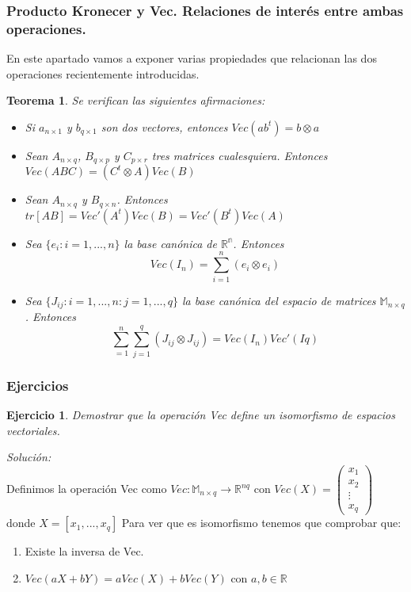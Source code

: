 \documentclass{article}
\theoremstyle{theorem-style}  %
\newtheorem{theorem}{Teorema}[section]  %
\theoremstyle{definition-style}
\theoremstyle{example-style}
\theoremstyle{exercise-style}
\newtheorem{exercise}{Ejercicio}[section]
\begin{document}
	
	\subsubsection{Producto Kronecer y Vec. Relaciones de interés entre ambas operaciones.}
	
	En este apartado vamos a exponer varias propiedades que relacionan las dos operaciones recientemente introducidas.
	
	\begin{theorem}\label{PropKroVec}
		\textit{Se verifican las siguientes afirmaciones:}
		
		\begin{itemize}
			\item \textit{Si $a_{n \times 1}$ y $b_{q \times 1}$ son dos vectores, entonces $Vec(a b^t )=b \otimes a$}
			
			\item \textit{Sean $A_{n \times q}$, $B_{q \times p}$ y $C_{p \times r }$ tres matrices cualesquiera. Entonces $Vec(ABC) = (C^t \otimes A)Vec(B)$}
			
			\item \textit{Sean $A_{n \times q}$ y $B_{q \times n}$. Entonces $tr[AB] = Vec'(A^t)Vec(B) = Vec'(B^t)Vec(A)$}
			
			\item \textit{Sea $\{e_i: i = 1, ..., n\}$ la base canónica de  $\mathbb{R^n}$. Entonces $$Vec(I_n) = \sum_{i=1}^{n}(e_i \otimes e_i)$$}
			
			\item \textit{Sea $\{J_{ij}: i = 1, ..., n: j = 1, ..., q\}$ la base canónica del espacio de matrices $\mathbb{M}_{n \times q}$. Entonces $$\sum_{=1}^{n}  \sum_{j=1}^{q} (J_{ij} \otimes J_{ij}) = Vec(I_n) Vec'(Iq)$$ }
			
		\end{itemize}
	\end{theorem}
	
	\subsubsection{Ejercicios}
	
	\begin{exercise}
		Demostrar que la operación Vec define un isomorfismo de espacios vectoriales.
	\end{exercise}
	\textit{Solución:}
	\\Definimos la operación Vec como $Vec: \mathbb{M}_{n\times q} \rightarrow \mathbb{R}^{nq}$ con $ Vec(X) = \left({\begin{array}{c}
		x_1\\
		x_2\\
		\vdots \\
		x_q
		\end{array} } \right)$ donde $X=[x_1,...,x_q]$
	Para ver que es isomorfismo tenemos que comprobar que:
	\begin{enumerate}
		\item Existe la inversa de Vec.
		\item $Vec(aX+bY)=aVec(X)+bVec(Y)$ con $a,b \in \mathbb{R}$
	\end{enumerate}
	
\end{document}
